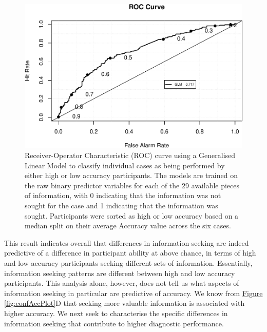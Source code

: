 \documentclass[a4paper, nobind]{templates/ociamthesis}
\begin{document}
\begin{figure}[H]

{\centering \includegraphics[width=1\linewidth]{_main_files/figure-latex/accuracyClassifier-1} 

}

\caption[Online Study: Information Seeking Patterns Predicting Accuracy (ROC Curve)]{Receiver-Operator Characteristic (ROC) curve using a Generalised Linear Model to classify individual cases as being performed by either high or low accuracy participants. The models are trained on the raw binary predictor variables for each of the 29 available pieces of information, with 0 indicating that the information was not sought for the case and 1 indicating that the information was sought. Participants were sorted as high or low accuracy based on a median split on their average Accuracy value across the six cases.}\label{fig:accuracyClassifier}
\end{figure}

This result indicates overall that differences in information seeking are indeed predictive of a difference in participant ability at above chance, in terms of high and low accuracy participants seeking different sets of information. Essentially, information seeking patterns are different between high and low accuracy participants. This analysis alone, however, does not tell us what aspects of information seeking in particular are predictive of accuracy. We know from \hyperref[fig:confAccPlot]{Figure \ref{fig:confAccPlot}}D that seeking more valuable information is associated with higher accuracy. We next seek to characterise the specific differences in information seeking that contribute to higher diagnostic performance.\\
\end{document}
